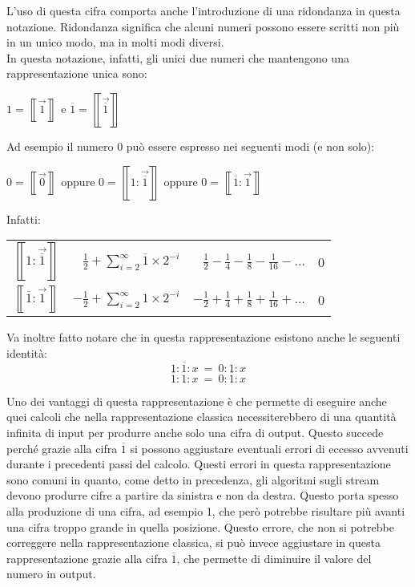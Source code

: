 \documentclass[Lau]{sapthesis}
\begin{document}
L'uso di questa cifra comporta anche l'introduzione di una ridondanza in questa 
notazione. Ridondanza significa che alcuni numeri possono essere scritti non più 
in un unico modo, ma in molti modi diversi.\\
In questa notazione, infatti, gli unici due numeri che mantengono una 
rappresentazione unica sono:
\begin{center}
$1=\left\llbracket\overrightarrow{1}\right\rrbracket$ \hspace{0.5cm} e 
\hspace{0.5cm} 
$\overline{1}=\left\llbracket\overrightarrow{\overline{1}}\right\rrbracket$
\end{center}
Ad esempio il numero 0 può essere espresso nei seguenti modi (e non solo):
\begin{center}
$0=\left\llbracket\overrightarrow{0}\right\rrbracket$ \hspace{0.5cm} oppure 
\hspace{0.5cm} 
$0=\left\llbracket1:\overrightarrow{\overline{1}}\right\rrbracket$ 
\hspace{0.5cm} oppure \hspace{0.5cm}
$0=\left\llbracket\overline{1}:\overrightarrow{1}\right\rrbracket$\\
\end{center}
Infatti:
\begin{center}
\def\arraystretch{3}
\begin{tabular}{c@{ = }r@{ = }r@{ = }c}
$\displaystyle \left\llbracket 1:\overrightarrow{\overline{1}} \right\rrbracket$ &
$\displaystyle \frac{1}{2}+\sum_{i=2}^{\infty}\overline{1} \times 2^{-i}$ &
$\displaystyle \frac{1}{2}-\frac{1}{4}-\frac{1}{8}-\frac{1}{16}-\ldots$ &
0\\
$\displaystyle \left\llbracket \overline{1}:\overrightarrow{1} \right\rrbracket$ &
$\displaystyle -\frac{1}{2}+\sum_{i=2}^{\infty} 1 \times 2^{-i}$ &
$\displaystyle -\frac{1}{2}+\frac{1}{4}+\frac{1}{8}+\frac{1}{16}+\ldots$ &
0
\end{tabular}
\end{center}

Va inoltre fatto notare che in questa rappresentazione esistono anche le seguenti identità:
$$1:\overline{1}:x\ =\ 0:1:x$$
$$\overline{1}:1:x\ =\ 0:\overline{1}:x$$

Uno dei vantaggi di questa rappresentazione è che permette di eseguire anche quei 
calcoli che nella rappresentazione classica necessiterebbero di una quantità 
infinita di input per produrre anche solo una cifra di output. Questo succede 
perché grazie alla cifra $\overline{1}$ si possono aggiustare eventuali errori di eccesso avvenuti durante i precedenti passi del calcolo. Questi errori in questa rappresentazione sono comuni in quanto, come detto in precedenza, gli algoritmi sugli stream devono produrre cifre a partire da sinistra e non da destra. Questo porta spesso alla produzione di una cifra, ad esempio 1, che però potrebbe risultare più avanti una cifra troppo grande in quella posizione. Questo errore, che non si potrebbe correggere nella rappresentazione classica, si può invece aggiustare in questa rappresentazione grazie alla cifra $\overline{1}$, che permette di diminuire il valore del numero in output.
\end{document}
